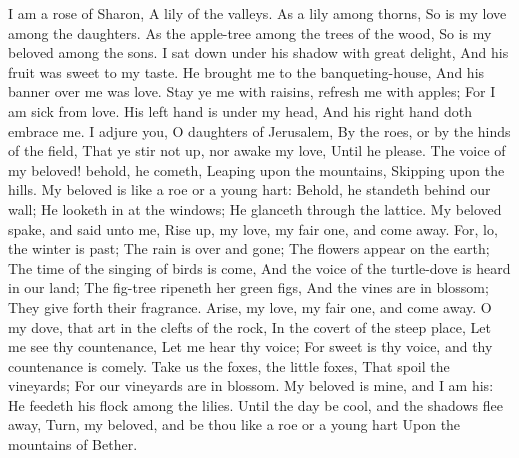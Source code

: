 I am a rose of Sharon, A lily of the valleys.  As a lily among thorns, So is my love among the daughters.  As the apple-tree among the trees of the wood, So is my beloved among the sons. I sat down under his shadow with great delight, And his fruit was sweet to my taste.  He brought me to the banqueting-house, And his banner over me was love.  Stay ye me with raisins, refresh me with apples; For I am sick from love.  His left hand is under my head, And his right hand doth embrace me.  I adjure you, O daughters of Jerusalem, By the roes, or by the hinds of the field, That ye stir not up, nor awake my love, Until he please.  The voice of my beloved! behold, he cometh, Leaping upon the mountains, Skipping upon the hills.  My beloved is like a roe or a young hart: Behold, he standeth behind our wall; He looketh in at the windows; He glanceth through the lattice.  My beloved spake, and said unto me, Rise up, my love, my fair one, and come away.  For, lo, the winter is past; The rain is over and gone;  The flowers appear on the earth; The time of the singing of birds is come, And the voice of the turtle-dove is heard in our land;  The fig-tree ripeneth her green figs, And the vines are in blossom; They give forth their fragrance. Arise, my love, my fair one, and come away.  O my dove, that art in the clefts of the rock, In the covert of the steep place, Let me see thy countenance, Let me hear thy voice; For sweet is thy voice, and thy countenance is comely.  Take us the foxes, the little foxes, That spoil the vineyards; For our vineyards are in blossom.  My beloved is mine, and I am his: He feedeth his flock among the lilies.  Until the day be cool, and the shadows flee away, Turn, my beloved, and be thou like a roe or a young hart Upon the mountains of Bether. 

